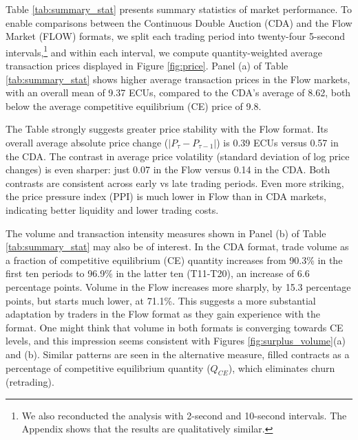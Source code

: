 \documentclass[12pt]{article}
\begin{document}
Table \ref{tab:summary_stat} presents summary statistics of market performance. To enable comparisons between the Continuous Double Auction (CDA) and the Flow Market (FLOW) formats, we split each trading period into twenty-four 5-second intervals,\footnote{We also reconducted the analysis with 2-second and 10-second intervals. The Appendix shows that the results are qualitatively similar.}
and within each interval, we compute quantity-weighted average transaction prices displayed in Figure \ref{fig:price}.
Panel (a) of Table \ref{tab:summary_stat} %
shows higher average transaction prices in the Flow markets, with an overall mean of 9.37 ECUs, compared to the CDA’s average of 8.62, both below the average competitive equilibrium (CE) price of 9.8. %


The Table strongly suggests greater price stability with the Flow format. 
Its overall average absolute price change (\(|P_\tau - P_{\tau-1}|\)) is 0.39 ECUs versus 0.57 in the CDA. 
The contrast in average price volatility (standard deviation of log price changes) is even sharper:
just 0.07 in the Flow versus 0.14 in the CDA.
Both contrasts are consistent across early vs late trading periods. %
Even more striking, the price pressure index (PPI) is much lower in Flow than in CDA markets, indicating better liquidity and lower trading costs. 

The volume and transaction intensity measures shown in Panel (b) of Table \ref{tab:summary_stat} may also be of interest.
In the CDA format, trade volume as a fraction of competitive equilibrium (CE) quantity increases from 90.3\% in the first ten periods to 96.9\% in the latter ten (T11-T20), an increase of 6.6 percentage points. Volume in the Flow increases more sharply, by 15.3 percentage points, but starts much lower, at 71.1\%. %
This suggests a more substantial adaptation by traders in the Flow format as they gain experience with the format. 
One might think that volume in both formats is converging towards CE levels, and this impression seems consistent with  Figures \ref{fig:surplus_volume}(a) and (b).
Similar patterns are seen in the alternative measure, filled contracts as a percentage of competitive equilibrium quantity (\(Q_{CE}\)), which eliminates churn (retrading). 
\end{document}
